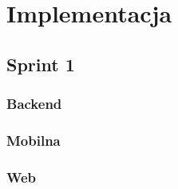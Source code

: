 \chapter{Implementacja}

\section{Sprint 1}
\subsection{Backend}
\subsection{Mobilna}
\subsection{Web}